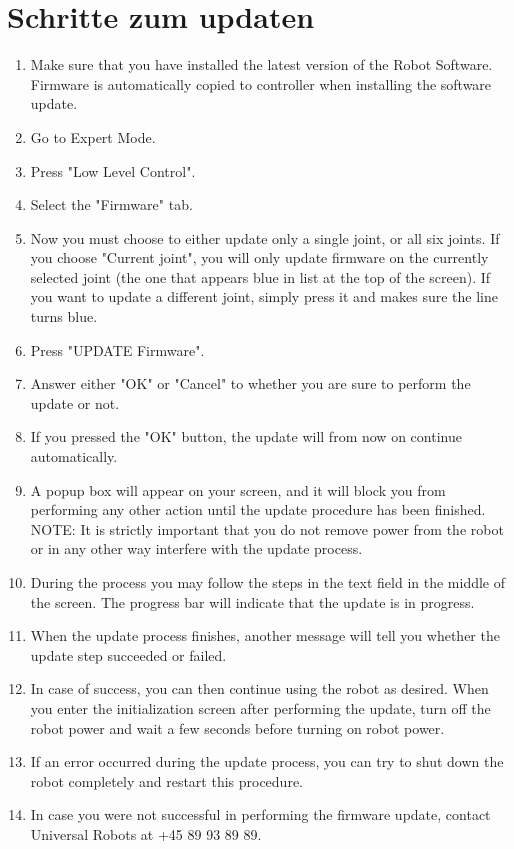 \documentclass[
a4paper,
12pt,
oneside,
headsepline,		%
footsepline,		%
]{scrbook}
\begin{document}
\section{Schritte zum updaten}
\label{update_steps}

\begin{enumerate}
\item Make sure that you have installed the latest version of the Robot Software. Firmware is automatically copied to controller when installing the software update.
\item Go to Expert Mode.
\item Press "Low Level Control".
\item Select the "Firmware" tab.
\item Now you must choose to either update only a single joint, or all six joints. If you choose "Current joint", you will only update firmware on the currently selected joint (the one that appears blue in list at the top of the screen). If you want to update a different joint, simply press it and makes sure the line turns blue.
\item Press "UPDATE Firmware".
\item Answer either "OK" or "Cancel" to whether you are sure to perform the update or not.
\item If you pressed the "OK" button, the update will from now on continue automatically.
\item A popup box will appear on your screen, and it will block you from performing any other action until the update procedure has been finished. NOTE: It is strictly important that you do not remove power from the robot or in any other way interfere with the update process.
\item During the process you may follow the steps in the text field in the middle of the screen. The progress bar will indicate that the update is in progress.
\item When the update process finishes, another message will tell you whether the update step succeeded or failed.
\item In case of success, you can then continue using the robot as desired. When you enter the initialization screen after performing the update, turn off the robot power and wait a few seconds before turning on robot power.
\item If an error occurred during the update process, you can try to shut down the robot completely and restart this procedure.
\item In case you were not successful in performing the firmware update, contact Universal Robots at +45 89 93 89 89. 
\end{enumerate}
\end{document}
